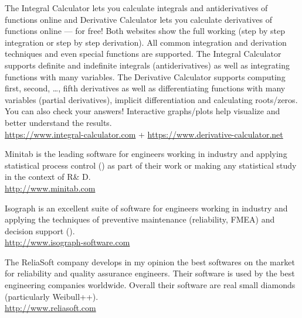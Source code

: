 	{\Large {}}{\Large {}}{\Large {}}{\Large {}} The Integral Calculator lets you calculate integrals and antiderivatives of functions online and Derivative Calculator lets you calculate derivatives of functions online — for free! Both websites show the full working (step by step integration or step by step derivation). All common integration and derivation techniques and even special functions are supported. The Integral Calculator supports definite and indefinite integrals (antiderivatives) as well as integrating functions with many variables. The Derivative Calculator supports computing first, second, …, fifth derivatives as well as differentiating functions with many variables (partial derivatives), implicit differentiation and calculating roots/zeros. You can also check your answers! Interactive graphs/plots help visualize and better understand the results.\\
	\href{https://www.integral-calculator.com}{\color{blue}https://www.integral-calculator.com} + \href{https://www.derivative-calculator.net}{\color{blue}https://www.derivative-calculator.net}
	
	{\Large {}}{\Large {}}{\Large {}}{\Large {}} Minitab is the leading software for engineers working in industry and applying statistical process control () as part of their work or making any statistical study in the context of R\& D.\\
	\href{http://www.minitab.com}{\color{blue}http://www.minitab.com}
	
	{\Large {}}{\Large {}}{\Large {}}{\Large {}} Isograph is an excellent suite of software for engineers working in industry and applying the techniques of preventive maintenance (reliability, FMEA) and decision support ().\\
	\href{http://www.isograph-software.com}{\color{blue}http://www.isograph-software.com}
	
	{\Large {}}{\Large {}}{\Large {}}{\Large {}} The ReliaSoft company develops in my opinion the best softwares on the market for reliability and quality assurance engineers. Their software is used by the best engineering companies worldwide. Overall their software are real small diamonds (particularly Weibull++).\\
	\href{http://www.reliasoft.com}{\color{blue}http://www.reliasoft.com}
	
